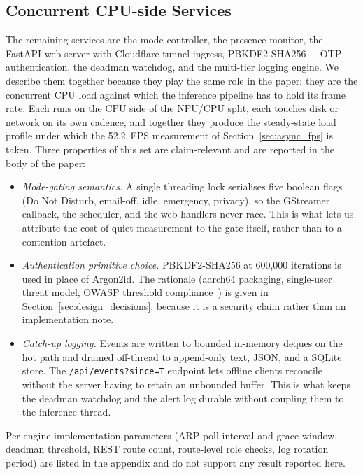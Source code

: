 \documentclass{ieeeaccess}
\begin{document}
\subsection{Concurrent CPU-side Services}
\label{sec:cpu_services}
The remaining services are the mode controller, the presence monitor, the FastAPI web server with Cloudflare-tunnel ingress, PBKDF2-SHA256 + OTP authentication, the deadman watchdog, and the multi-tier logging engine. We describe them together because they play the same role in the paper: they are the concurrent CPU load against which the inference pipeline has to hold its frame rate. Each runs on the CPU side of the NPU/CPU split, each touches disk or network on its own cadence, and together they produce the steady-state load profile under which the 52.2~FPS measurement of Section~\ref{sec:async_fps} is taken. Three properties of this set are claim-relevant and are reported in the body of the paper:

\begin{itemize}
\item \emph{Mode-gating semantics.} A single threading lock serialises five boolean flags (Do Not Disturb, email-off, idle, emergency, privacy), so the GStreamer callback, the scheduler, and the web handlers never race. This is what lets us attribute the cost-of-quiet measurement to the gate itself, rather than to a contention artefact.
\item \emph{Authentication primitive choice.} PBKDF2-SHA256 at 600{,}000 iterations is used in place of Argon2id. The rationale (aarch64 packaging, single-user threat model, OWASP threshold compliance~\cite{b16}) is given in Section~\ref{sec:design_decisions}, because it is a security claim rather than an implementation note.
\item \emph{Catch-up logging.} Events are written to bounded in-memory deques on the hot path and drained off-thread to append-only text, JSON, and a SQLite store. The \texttt{/api/events?since=T} endpoint lets offline clients reconcile without the server having to retain an unbounded buffer. This is what keeps the deadman watchdog and the alert log durable without coupling them to the inference thread.
\end{itemize}

Per-engine implementation parameters (ARP poll interval and grace window, deadman threshold, REST route count, route-level role checks, log rotation period) are listed in the appendix and do not support any result reported here.
\end{document}
